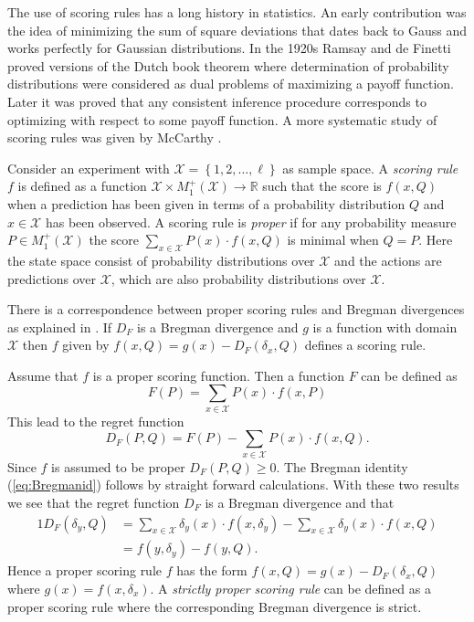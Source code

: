 \documentclass[10pt,a4paper,draft]{article}
\begin{document}
The use of scoring rules has a long history in statistics. An
early contribution was the idea of minimizing the sum of square
deviations that dates back to Gauss and works perfectly for Gaussian
distributions. In the 1920s Ramsay and de Finetti proved versions of the Dutch
book theorem where determination of probability distributions were
considered as dual problems of maximizing a payoff function. Later it was
proved that any consistent inference procedure corresponds to
optimizing with respect to some payoff function. A more systematic study of
scoring rules was given by McCarthy \cite{McCarthy1956}.

Consider an experiment with $\mathcal{X}=\left\{
1,2,\dots,\ell\right\} $
as sample space. A \emph{scoring rule} $f$ is defined as a
function $\mathcal{X}\times
M_{1}^{+}\left(\mathcal{X}\right)\to\mathbb{R}$
such that the score is $f\left(x,Q\right)$ when a prediction has been given in terms of a probability distribution $Q$ and $x\in\mathcal{X}$ has been observed. A
scoring rule is \emph{proper} if for any probability measure $P\in
M_{1}^{+}\left(\mathcal{X}\right)$
the score $\sum_{x\in\mathcal{X}}P\left(x\right)\cdot
f\left(x,Q\right)$ is minimal when $Q=P.$ Here the state space consist of
probability distributions over $\mathcal{X}$ and the actions are
predictions over $\mathcal{X}$, which are also probability distributions over
$\mathcal{X}$.

There is a correspondence between proper scoring rules and
Bregman divergences as explained in \cite{Gneiting2007, Ovcharov2015}. 
If $D_F$ is a Bregman divergence and $g$ is a function with domain ${\mathcal X}$ then $f$ given by
$f\left(x,Q\right)=g\left(x\right) - D_{F}\left(\delta_{x},Q\right)$ defines a scoring rule. 

Assume that $f$ is a proper scoring function. Then a function $F$ can be defined as
\[
F(P)=\sum_{x\in\mathcal{X}}P\left(x\right)\cdot f\left(x,P\right)
\]
This lead to the regret function
\begin{equation}
D_F\left(P,Q\right)=F(P)-\sum_{x\in\mathcal{X}}P\left(x\right)\cdot
f\left(x,Q\right).
\end{equation}
Since $f$ is assumed to be proper $D_F \left(P,Q\right)\geq0$. The Bregman identity (\ref{eq:Bregmanid})
follows by straight forward calculations. With these two results
we see that the regret function $D_F$ is a Bregman divergence and that 
\begin{alignat}{1}
D_{F}\left(\delta_{y},Q\right) &
=\sum_{x\in\mathcal{X}}\delta_{y}\left(x\right)\cdot
f\left(x,\delta_{y}\right)\nonumber - \sum_{x\in\mathcal{X}}\delta_{y}\left(x\right)\cdot
f\left(x,Q\right) \\
 & =f\left(y,\delta_{y}\right) - f\left(y,Q\right).
\end{alignat}
Hence a proper scoring rule $f$ has the form 
$f\left(x,Q\right)= g(x) - D_{F}\left(\delta_{x},Q\right)$ where $g(x)=f\left(x,\delta_{x}\right)$. A {\em  strictly proper scoring rule} can be defined as a proper scoring rule where the corresponding Bregman divergence is strict.
\end{document}
